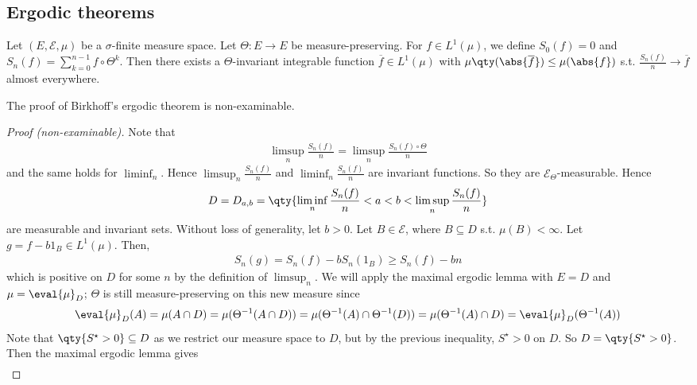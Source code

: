 \subsection{Ergodic theorems}
\begin{theorem}[Birkhoff]
	Let $(E, \mathcal E, \mu)$ be a $\sigma$-finite measure space.
	Let $\Theta \colon E \to E$ be measure-preserving.
	For $f \in L^1(\mu)$, we define $S_0(f) = 0$ and $S_n(f) = \sum_{k=0}^{n-1} f \circ \Theta^k$.
	Then there exists a $\Theta$-invariant integrable function $\overline f \in L^1(\mu)$ with $\mu\qty(\abs{\overline f}) \leq \mu(\abs{f})$ s.t. $\frac{S_n(f)}{n} \to \overline f$ almost everywhere.
\end{theorem}
The proof of Birkhoff's ergodic theorem is non-examinable.
\begin{proof}[Proof (non-examinable)]
    Note that
    \begin{align*}
        \limsup_n \frac{S_n(f)}{n} =  \limsup_n \frac{S_n(f) \circ \Theta}{n}
    \end{align*}
    and the same holds for $\liminf_n$.
    Hence $\limsup_n \frac{S_n(f)}{n}$ and $\liminf_n \frac{S_n(f)}{n}$ are invariant functions.
    So they are $\mathcal E_\Theta$-measurable.
    Hence
    \begin{align*}
        D = D_{a,b} = \qty{\liminf_n \frac{S_n(f)}{n} < a < b < \limsup_n \frac{S_n(f)}{n}}
    \end{align*}
    are measurable and invariant sets.
    Without loss of generality, let $b > 0$.
    Let $B \in \mathcal E$, where $B \subseteq D$ s.t. $\mu(B) < \infty$.
    Let $g = f - b 1_B \in L^1(\mu)$.
    Then,
    \begin{align*}
        S_n(g) = S_n(f) - bS_n(1_B) \geq S_n(f) - bn
    \end{align*}
    which is positive on $D$ for some $n$ by the definition of $\limsup_n$.
    We will apply the maximal ergodic lemma with $E = D$ and $\mu = \eval{\mu}_D$; $\Theta$ is still measure-preserving on this new measure since
    \begin{align*}
        \eval{\mu}_D(A) = \mu(A \cap D) = \mu(\Theta^{-1}(A \cap D)) = \mu(\Theta^{-1}(A) \cap \Theta^{-1}(D)) = \mu(\Theta^{-1}(A) \cap D) = \eval{\mu}_D(\Theta^{-1}(A))
    \end{align*}
    Note that $\qty{S^\star > 0} \subseteq D$ as we restrict our measure space to $D$, but by the previous inequality, $S^\star > 0$ on $D$.
    So $D = \qty{S^\star > 0}$.
    Then the maximal ergodic lemma gives
    \begin{align*}

\end{align*}
\end{proof}
